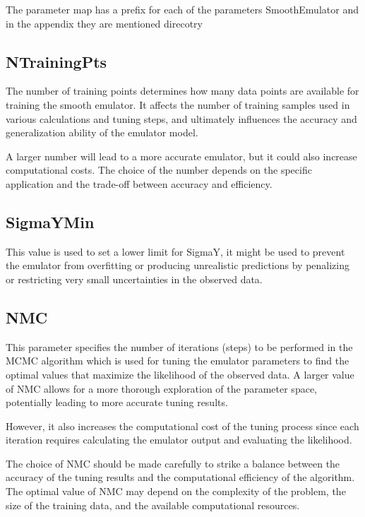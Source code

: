 \documentclass[12pt]{article}
\numberwithin{equation}{section}
\numberwithin{figure}{section}
\begin{document}
The parameter map has a prefix for each of the parameters SmoothEmulator and in the appendix they are mentioned direcotry 

\subsection{NTrainingPts}
 The number of training points determines how many data points are available for training the smooth emulator. It affects the number of training samples used in various calculations and tuning steps, and ultimately influences the accuracy and generalization ability of the emulator model. 

A larger number will lead to a more accurate emulator, but it could also increase computational costs. The choice of the number depends on the specific application and the trade-off between accuracy and efficiency.


\subsection{SigmaYMin}
 
This value is used to set a lower limit for SigmaY, it might be used to prevent the emulator from overfitting or producing unrealistic predictions by penalizing or restricting very small uncertainties in the observed data. 



\subsection{NMC}

This parameter specifies the number of iterations (steps) to be performed in the MCMC algorithm which is used for tuning the emulator parameters to find the optimal values that maximize the likelihood of the observed data. A larger value of NMC allows for a more thorough exploration of the parameter space, potentially leading to more accurate tuning results.

However, it also increases the computational cost of the tuning process since each iteration requires calculating the emulator output and evaluating the likelihood.

The choice of NMC should be made carefully to strike a balance between the accuracy of the tuning results and the computational efficiency of the algorithm. The optimal value of NMC may depend on the complexity of the problem, the size of the training data, and the available computational resources.  
\end{document}
